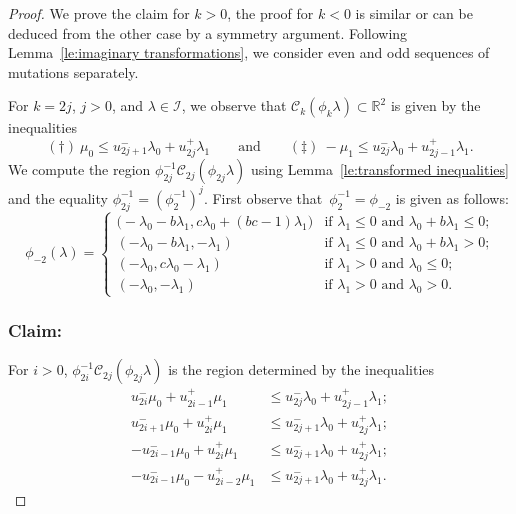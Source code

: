 \documentclass{amsart}
\numberwithin{theorem}{section}
\newcommand{\cC}{\mathcal{C}}
\newcommand{\cI}{\mathcal{I}}
\newcommand{\RR}{\mathbb{R}}
\begin{document}
  \begin{proof}
    We prove the claim for $k>0$, the proof for $k<0$ is similar or can be deduced from the other case by a symmetry argument.
    Following Lemma~\ref{le:imaginary transformations}, we consider even and odd sequences of mutations separately.

    For $k=2j$, $j>0$, and $\lambda\in\cI$, we observe that $\cC_k(\phi_k\lambda)\subset\RR^2$ is given by the inequalities 
    \[ (\dagger)\ \mu_0 \le u_{2j+1}^-\lambda_0+u_{2j}^+\lambda_1 \qquad\text{and}\qquad (\ddagger)\ -\mu_1\le u_{2j}^-\lambda_0+u_{2j-1}^+\lambda_1. \]
    We compute the region $\phi_{2j}^{-1}\cC_{2j}(\phi_{2j}\lambda)$ using Lemma~\ref{le:transformed inequalities} and the equality $\phi_{2j}^{-1}=\left(\phi_2^{-1}\right)^{j}$.
    First observe that~$\phi_2^{-1}=\phi_{-2}$ is given as follows:
    \begin{equation}
      \label{eq:backward two step mutation}
      \phi_{-2}(\lambda)
      =
      \begin{cases}
        \big(-\lambda_0-b\lambda_1, c\lambda_0+(bc-1)\lambda_1\big) & \text{if $\lambda_1\le 0$ and $\lambda_0+b\lambda_1\le 0$;}\\
        (-\lambda_0-b\lambda_1, -\lambda_1) & \text{if $\lambda_1\le 0$ and $\lambda_0+b\lambda_1>0$;}\\
        (-\lambda_0, c\lambda_0-\lambda_1) & \text{if $\lambda_1>0$ and $\lambda_0\le 0$;}\\
        (-\lambda_0,-\lambda_1) & \text{if $\lambda_1>0$ and $\lambda_0>0$.}
      \end{cases}
    \end{equation}
  
    \subsubsection*{Claim:} For $i>0$, $\phi_{2i}^{-1}\cC_{2j}(\phi_{2j}\lambda)$ is the region determined by the inequalities 
    \begin{align*}
      \tag{a} u_{2i}^-\mu_0+u_{2i-1}^+\mu_1 &\le u_{2j}^-\lambda_0+u_{2j-1}^+\lambda_1;\\
      \tag{b} u_{2i+1}^-\mu_0+u_{2i}^+\mu_1 &\le u_{2j+1}^-\lambda_0+u_{2j}^+\lambda_1;\\
      \tag{c} -u_{2i-1}^-\mu_0+u_{2i}^+\mu_1 &\le u_{2j+1}^-\lambda_0+u_{2j}^+\lambda_1;\\
      \tag{d} -u_{2i-1}^-\mu_0-u_{2i-2}^+\mu_1 &\le u_{2j+1}^-\lambda_0+u_{2j}^+\lambda_1.
    \end{align*}


\end{proof}
\end{document}
